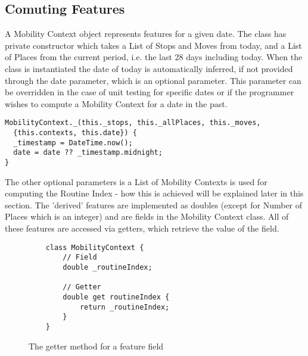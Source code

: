 \subsection{Comuting Features}
A Mobility Context object represents features for a given date. The class has private constructor which takes a List of Stops and Moves from today, and a List of Places from the current period, i.e. the last 28 days including today. When the class is instantiated the date of today is automatically inferred, if not provided through the date parameter, which is an optional parameter. This parameter can be overridden in the case of unit testing for specific dates or if the programmer wishes to compute a Mobility Context for a date in the past.

\begin{verbatim}
MobilityContext._(this._stops, this._allPlaces, this._moves,
  {this.contexts, this.date}) {
  _timestamp = DateTime.now();
  date = date ?? _timestamp.midnight;
}
\end{verbatim}

The other optional parameters is a List of Mobility Contexts is used for computing the Routine Index - how this is achieved will be explained later in this section. The 'derived' features are implemented as doubles (except for Number of Places which is an integer) and are fields in the Mobility Context class. All of these features are accessed via getters, which retrieve the value of the field.

\begin{figure}
    \centering
    \begin{verbatim}
    class MobilityContext {
    	// Field
    	double _routineIndex;
     
     	// Getter
        double get routineIndex {
        	return _routineIndex;
        }
    }
    \end{verbatim}
    \caption{The getter method for a feature field}
    \label{fig:feature-getter}
\end{figure}

